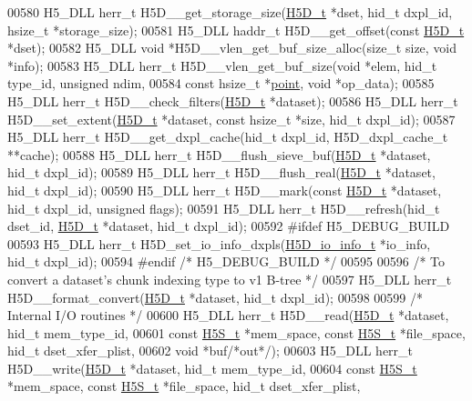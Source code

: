 \begin{DoxyCode}
00580 H5\_DLL herr\_t H5D\_\_get\_storage\_size(\hyperlink{struct_h5_d__t}{H5D\_t} *dset, hid\_t dxpl\_id, hsize\_t *storage\_size);
00581 H5\_DLL haddr\_t H5D\_\_get\_offset(\textcolor{keyword}{const} \hyperlink{struct_h5_d__t}{H5D\_t} *dset);
00582 H5\_DLL \textcolor{keywordtype}{void} *H5D\_\_vlen\_get\_buf\_size\_alloc(\textcolor{keywordtype}{size\_t} size, \textcolor{keywordtype}{void} *info);
00583 H5\_DLL herr\_t H5D\_\_vlen\_get\_buf\_size(\textcolor{keywordtype}{void} *elem, hid\_t type\_id, \textcolor{keywordtype}{unsigned} ndim,
00584     \textcolor{keyword}{const} hsize\_t *\hyperlink{structpoint}{point}, \textcolor{keywordtype}{void} *op\_data);
00585 H5\_DLL herr\_t H5D\_\_check\_filters(\hyperlink{struct_h5_d__t}{H5D\_t} *dataset);
00586 H5\_DLL herr\_t H5D\_\_set\_extent(\hyperlink{struct_h5_d__t}{H5D\_t} *dataset, \textcolor{keyword}{const} hsize\_t *size, hid\_t dxpl\_id);
00587 H5\_DLL herr\_t H5D\_\_get\_dxpl\_cache(hid\_t dxpl\_id, H5D\_dxpl\_cache\_t **cache);
00588 H5\_DLL herr\_t H5D\_\_flush\_sieve\_buf(\hyperlink{struct_h5_d__t}{H5D\_t} *dataset, hid\_t dxpl\_id);
00589 H5\_DLL herr\_t H5D\_\_flush\_real(\hyperlink{struct_h5_d__t}{H5D\_t} *dataset, hid\_t dxpl\_id);
00590 H5\_DLL herr\_t H5D\_\_mark(\textcolor{keyword}{const} \hyperlink{struct_h5_d__t}{H5D\_t} *dataset, hid\_t dxpl\_id, \textcolor{keywordtype}{unsigned} flags);
00591 H5\_DLL herr\_t H5D\_\_refresh(hid\_t dset\_id, \hyperlink{struct_h5_d__t}{H5D\_t} *dataset, hid\_t dxpl\_id);
00592 \textcolor{preprocessor}{#ifdef H5\_DEBUG\_BUILD}
00593 H5\_DLL herr\_t H5D\_set\_io\_info\_dxpls(\hyperlink{struct_h5_d__io__info__t}{H5D\_io\_info\_t} *io\_info, hid\_t dxpl\_id);
00594 \textcolor{preprocessor}{#endif }\textcolor{comment}{/* H5\_DEBUG\_BUILD */}\textcolor{preprocessor}{}
00595 
00596 \textcolor{comment}{/* To convert a dataset's chunk indexing type to v1 B-tree */}
00597 H5\_DLL herr\_t H5D\_\_format\_convert(\hyperlink{struct_h5_d__t}{H5D\_t} *dataset, hid\_t dxpl\_id);
00598 
00599 \textcolor{comment}{/* Internal I/O routines */}
00600 H5\_DLL herr\_t H5D\_\_read(\hyperlink{struct_h5_d__t}{H5D\_t} *dataset, hid\_t mem\_type\_id,
00601     \textcolor{keyword}{const} \hyperlink{struct_h5_s__t}{H5S\_t} *mem\_space, \textcolor{keyword}{const} \hyperlink{struct_h5_s__t}{H5S\_t} *file\_space, hid\_t dset\_xfer\_plist,
00602     \textcolor{keywordtype}{void} *buf\textcolor{comment}{/*out*/});
00603 H5\_DLL herr\_t H5D\_\_write(\hyperlink{struct_h5_d__t}{H5D\_t} *dataset, hid\_t mem\_type\_id,
00604     \textcolor{keyword}{const} \hyperlink{struct_h5_s__t}{H5S\_t} *mem\_space, \textcolor{keyword}{const} \hyperlink{struct_h5_s__t}{H5S\_t} *file\_space, hid\_t dset\_xfer\_plist,

\end{DoxyCode}
